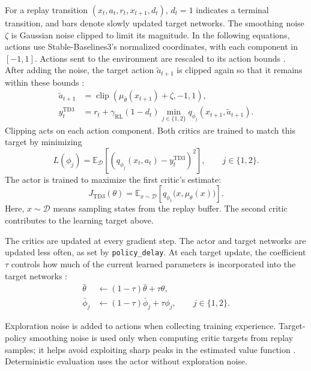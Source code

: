 \documentclass[12pt]{article}
\begin{document}
For a replay transition $(x_t,a_t,r_t,x_{t+1},d_t)$, $d_t=1$ indicates a
terminal transition, and bars denote slowly updated target networks.
The smoothing noise $\zeta$ is Gaussian noise clipped to limit its magnitude.
In the following equations, actions use Stable-Baselines3's normalized
coordinates, with each component in $[-1,1]$. Actions sent to the environment
are rescaled to its action bounds \cite{sb3implementation270}.
After adding the noise, the target action $\tilde a_{t+1}$ is clipped again
so that it remains within these bounds \cite{sb3implementation270}:
\begin{align*}
\tilde a_{t+1} &= \operatorname{clip}\!\left(
\mu_{\bar\theta}(x_{t+1})+\zeta,-1,1\right),\\
y_t^{\mathrm{TD3}} &= r_t+\gamma_{\mathrm{RL}}(1-d_t)
\min_{j\in\{1,2\}}q_{\bar\phi_j}\!\left(x_{t+1},\tilde a_{t+1}\right).
\end{align*}
Clipping acts on each action component. Both critics are trained to match
this target by minimizing
\[
L(\phi_j)=\mathbb{E}_{\mathcal{D}}\!\left[
\left(q_{\phi_j}(x_t,a_t)-y_t^{\mathrm{TD3}}\right)^2\right],
\qquad j\in\{1,2\}.
\]
The actor is trained to maximize the first critic's estimate:
\[
J_{\mathrm{TD3}}(\theta)=\mathbb{E}_{x\sim\mathcal{D}}\!\left[
q_{\phi_1}\bigl(x,\mu_\theta(x)\bigr)\right].
\]
Here, $x\sim\mathcal{D}$ means sampling states from the replay buffer.
The second critic contributes to the learning target above.

The critics are updated at every gradient step. The actor and target
networks are updated less often, as set by \texttt{policy\_delay}.
At each target update, the coefficient $\tau$ controls how much of the
current learned parameters is incorporated into the target networks
\cite{fujimoto2018addressing,sb3implementation270}:
\begin{align*}
\bar\theta &\leftarrow (1-\tau)\bar\theta+\tau\theta,\\
\bar\phi_j &\leftarrow (1-\tau)\bar\phi_j+\tau\phi_j,
\qquad j\in\{1,2\}.
\end{align*}

Exploration noise is added to actions when collecting training experience.
Target-policy smoothing noise is used only when computing critic targets
from replay samples; it helps avoid exploiting sharp peaks in the estimated
value function \cite{fujimoto2018addressing}.
Deterministic evaluation uses the actor without exploration noise.
\end{document}
